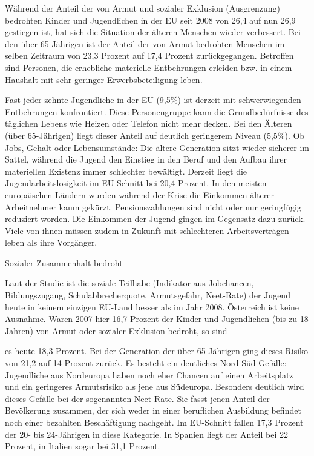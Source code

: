 Während der Anteil der von Armut und sozialer Exklusion (Ausgrenzung) bedrohten Kinder
und Jugendlichen in der EU seit 2008 von 26,4 auf nun 26,9 gestiegen ist, hat sich die Situation
der älteren Menschen wieder verbessert. Bei den über 65-Jährigen ist der Anteil der von Armut
bedrohten Menschen im selben Zeitraum von 23,3 Prozent auf 17,4 Prozent zurückgegangen.
Betroffen sind Personen, die erhebliche materielle Entbehrungen erleiden bzw. in einem
Haushalt mit sehr geringer Erwerbsbeteiligung leben.


Fast jeder zehnte Jugendliche in der EU (9,5\%) ist derzeit mit schwerwiegenden Entbehrungen
konfrontiert. Diese Personengruppe kann die Grundbedürfnisse des täglichen Lebens wie
Heizen oder Telefon nicht mehr decken. Bei den Älteren (über 65-Jährigen) liegt dieser Anteil
auf deutlich geringerem Niveau (5,5\%).
Ob Jobs, Gehalt oder Lebensumstände: Die ältere Generation sitzt wieder sicherer im Sattel,
während die Jugend den Einstieg in den Beruf und den Aufbau ihrer materiellen Existenz immer
schlechter bewältigt. Derzeit liegt die Jugendarbeitslosigkeit im EU-Schnitt bei 20,4 Prozent.
In den meisten europäischen Ländern wurden während der Krise die Einkommen älterer
Arbeitnehmer kaum gekürzt. Pensionszahlungen sind nicht oder nur geringfügig reduziert
worden. Die Einkommen der Jugend gingen im Gegensatz dazu zurück. Viele von ihnen
müssen zudem in Zukunft mit schlechteren Arbeitsverträgen leben als ihre Vorgänger.


Sozialer Zusammenhalt bedroht

Laut der Studie ist die soziale Teilhabe (Indikator aus Jobchancen, Bildungszugang,
Schulabbrecherquote, Armutsgefahr, Neet-Rate) der Jugend heute in keinem einzigen EU-Land
besser als im Jahr 2008. Österreich ist keine Ausnahme. Waren 2007 hier 16,7 Prozent der
Kinder und Jugendlichen (bis zu 18 Jahren) von Armut oder sozialer Exklusion bedroht, so sind 

es heute 18,3 Prozent. Bei der Generation der über 65-Jährigen ging dieses Risiko von 21,2 auf
14 Prozent zurück.
Es besteht ein deutliches Nord-Süd-Gefälle: Jugendliche aus Nordeuropa haben noch eher
Chancen auf einen Arbeitsplatz und ein geringeres Armutsrisiko als jene aus Südeuropa.
Besonders deutlich wird dieses Gefälle bei der sogenannten Neet-Rate. Sie fasst jenen Anteil
der Bevölkerung zusammen, der sich weder in einer beruflichen Ausbildung befindet noch einer
bezahlten Beschäftigung nachgeht. Im EU-Schnitt fallen 17,3 Prozent der 20- bis 24-Jährigen
in diese Kategorie. In Spanien liegt der Anteil bei 22 Prozent, in Italien sogar bei 31,1 Prozent.


